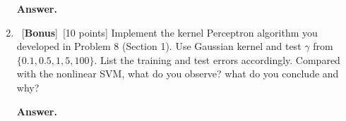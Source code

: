 \documentclass[12pt, fullpage,letterpaper]{article}
\begin{document}
\begin{enumerate}
\begin{enumerate}
\item[{\bf Answer.}]

	\item~[\textbf{Bonus}]~[10 points] Implement the kernel Perceptron algorithm you developed in Problem 8 (Section 1). Use Gaussian kernel and test $\gamma$ from $\{ 0.1, 0.5, 1, 5, 100\}$. List the training and test errors accordingly. Compared with the nonlinear SVM, what do you observe? what do you conclude and why?
	
\item[{\bf Answer.}]

\end{enumerate} 

\end{enumerate}
\end{document}
